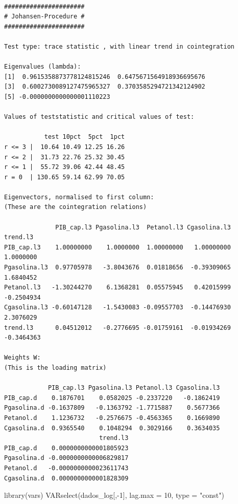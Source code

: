 \documentclass[
  letterpaper,
  DIV=11,
  numbers=noendperiod]{scrartcl}
\newenvironment{Shaded}{\begin{snugshade}}{\end{snugshade}}
\newcommand{\AttributeTok}[1]{\textcolor[rgb]{0.40,0.45,0.13}{#1}}
\newcommand{\DecValTok}[1]{\textcolor[rgb]{0.68,0.00,0.00}{#1}}
\newcommand{\FunctionTok}[1]{\textcolor[rgb]{0.28,0.35,0.67}{#1}}
\newcommand{\NormalTok}[1]{\textcolor[rgb]{0.00,0.23,0.31}{#1}}
\newcommand{\SpecialCharTok}[1]{\textcolor[rgb]{0.37,0.37,0.37}{#1}}
\newcommand{\StringTok}[1]{\textcolor[rgb]{0.13,0.47,0.30}{#1}}
\begin{document}
\begin{verbatim}

###################### 
# Johansen-Procedure # 
###################### 

Test type: trace statistic , with linear trend in cointegration 

Eigenvalues (lambda):
[1]  0.9615358873778124815246  0.6475671564918936695676
[3]  0.6002730089127475965327  0.3703585294721342124902
[5] -0.0000000000000001110223

Values of teststatistic and critical values of test:

           test 10pct  5pct  1pct
r <= 3 |  10.64 10.49 12.25 16.26
r <= 2 |  31.73 22.76 25.32 30.45
r <= 1 |  55.72 39.06 42.44 48.45
r = 0  | 130.65 59.14 62.99 70.05

Eigenvectors, normalised to first column:
(These are the cointegration relations)

              PIB_cap.l3 Pgasolina.l3  Petanol.l3 Cgasolina.l3   trend.l3
PIB_cap.l3    1.00000000    1.0000000  1.00000000   1.00000000  1.0000000
Pgasolina.l3  0.97705978   -3.8043676  0.01818656  -0.39309065  1.6840452
Petanol.l3   -1.30244270    6.1368281  0.05575945   0.42015999 -0.2504934
Cgasolina.l3 -0.60147128   -1.5430083 -0.09557703  -0.14476930  2.3076029
trend.l3      0.04512012   -0.2776695 -0.01759161  -0.01934269 -0.3464363

Weights W:
(This is the loading matrix)

            PIB_cap.l3 Pgasolina.l3 Petanol.l3 Cgasolina.l3
PIB_cap.d    0.1876701    0.0582025 -0.2337220   -0.1862419
Pgasolina.d -0.1637809   -0.1363792 -1.7715887    0.5677366
Petanol.d    1.1236732   -0.2576675 -0.4563365    0.1669890
Cgasolina.d  0.9365540    0.1048294  0.3029166    0.3634035
                          trend.l3
PIB_cap.d    0.0000000000001805923
Pgasolina.d -0.0000000000006829817
Petanol.d   -0.0000000000023611743
Cgasolina.d  0.0000000000001828309
\end{verbatim}

\begin{Shaded}
\begin{Highlighting}[]
\FunctionTok{library}\NormalTok{(vars)}
\FunctionTok{VARselect}\NormalTok{(dados\_log[,}\SpecialCharTok{{-}}\DecValTok{1}\NormalTok{], }\AttributeTok{lag.max =} \DecValTok{10}\NormalTok{, }\AttributeTok{type =} \StringTok{"const"}\NormalTok{)}
\end{Highlighting}
\end{Shaded}
\end{document}
